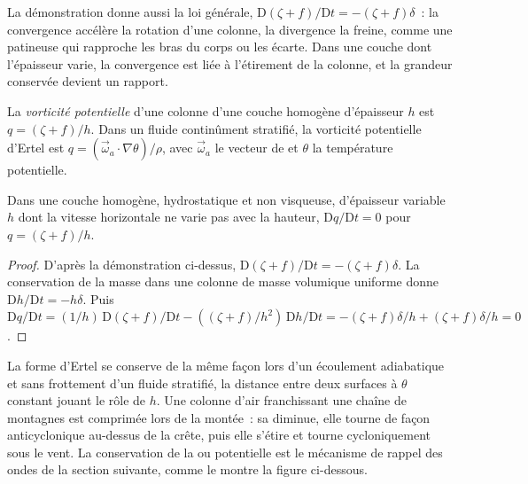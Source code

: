 La démonstration donne aussi la loi générale, $\mathrm D(\zeta + f)/\mathrm Dt =
-(\zeta + f)\delta$~: la convergence accélère la rotation d'une colonne, la divergence
la freine, comme une patineuse qui rapproche les bras du corps ou les écarte. Dans une couche dont
l'épaisseur varie, la convergence est liée à l'étirement de la colonne, et
la grandeur conservée devient un rapport.

\begin{definition}\label{def:b3:atmospheric-dynamics:pv}
La \emph{vorticité potentielle} d'une colonne d'une
couche homogène d'épaisseur $h$ est $q = (\zeta + f)/h$. Dans un fluide continûment
stratifié, la vorticité potentielle d'Ertel est $q = (\vec\omega_a\cdot
\nabla\theta)/\rho$, avec $\vec\omega_a$ le vecteur de  et
$\theta$ la température potentielle.
\end{definition}

\begin{theorem}\label{thm:b3:atmospheric-dynamics:pv}
Dans une couche homogène, hydrostatique et non visqueuse, d'épaisseur variable $h$ dont
la vitesse horizontale ne varie pas avec la hauteur, $\mathrm Dq/\mathrm Dt = 0$
pour $q = (\zeta + f)/h$.
\end{theorem}

\begin{proof}
D'après la démonstration ci-dessus, $\mathrm D(\zeta + f)/\mathrm Dt = -(\zeta + f)\delta$.
La conservation de la masse dans une colonne de masse volumique uniforme donne $\mathrm Dh/\mathrm
Dt = -h\delta$. Puis $\mathrm Dq/\mathrm Dt = (1/h)\,\mathrm D(\zeta +
f)/\mathrm Dt - ((\zeta + f)/h^2)\,\mathrm Dh/\mathrm Dt = -(\zeta +
f)\delta/h + (\zeta + f)\delta/h = 0$.
\end{proof}

La forme d'Ertel se conserve de la même façon lors d'un écoulement adiabatique et sans
frottement d'un fluide stratifié, la distance entre deux surfaces à
$\theta$ constant jouant le rôle de $h$. Une colonne d'air franchissant une chaîne de
montagnes est comprimée lors de la montée~: sa  diminue, elle tourne
de façon anticyclonique au-dessus de la crête, puis elle s'étire et tourne
cycloniquement sous le vent. La conservation de
la  ou potentielle est le mécanisme de rappel des ondes
de la section suivante, comme le montre la figure ci-dessous.

